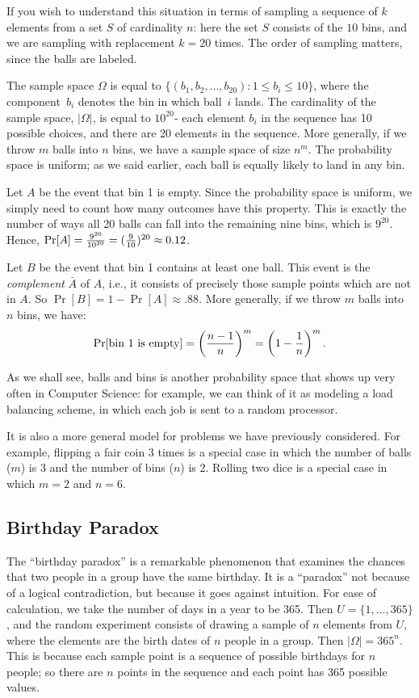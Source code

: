 \documentclass[11pt,fleqn]{article}
\begin{document}
If you wish to understand this situation in terms of sampling a sequence of $k$ elements 
from a set $S$ of cardinality $n$: here the set $S$ consists of the $10$ bins, and we are 
sampling with replacement $k= 20$ times. The order of sampling matters, since the balls 
are labeled. 

The sample space $\Omega$ is equal to 
$\{(b_1,b_2,\ldots,b_{20}):1\le b_i\le 10\}$, where the
component~$b_i$ denotes the bin in which ball~$i$ lands. The cardinality of
the sample space, $|\Omega|$, is equal to $10^{20}$- each element $b_i$ in the sequence
has 10 possible choices, and there are 20 elements in the sequence. More generally,
if we throw $m$ balls into $n$ bins, we have a sample space of size $n^m$. 
The probability space is uniform; as we said earlier, each ball is equally likely
to land in any bin. 

Let $A$ be the event that bin 1 is empty. Since the probability space is uniform, we simply
need to count how many outcomes have this property. This is 
exactly the number of ways all 20 balls can fall into the remaining nine bins, which is $9^{20}$. 
Hence, $\Pr[A]={{9^{20}}\over{{10}^{20}}}=({{9\over{10}}})^{20}\approx 0.12$.

Let $B$ be the event that bin 1 contains at least one ball. This event is the {\it complement\/} $\bar{A}$ of $A$, i.e., 
it consists of precisely those sample points which are not in $A$. So $\Pr[B] = 1 - \Pr[A] \approx .88$. 
More generally, if we throw $m$ balls into $n$ bins, we have: $$
               \Pr[\hbox{\rm bin 1 is empty}]=\left({{n-1}\over n}\right)^m=
                            \left({1-{1\over n}}\right)^m.  $$

As we shall see, balls and bins is another
probability space that shows up very often in Computer Science:
for example, we can think of it as modeling a load balancing
scheme, in which each job is sent to a random processor.

It is also a more general model for problems we have previously considered.
For example, flipping a fair coin 3 times is a special case in which the number of balls 
($m$) is 3 and the number of bins ($n$) is 2. Rolling two dice is a special case in which 
$m = 2$ and $n = 6$. 


\subsection*{Birthday Paradox}

The ``birthday paradox'' is a remarkable phenomenon that examines the chances that two people in a group
have the same birthday.  It is a ``paradox'' not because of a logical contradiction, but because it goes
against intuition. For ease of calculation, we take the number of days in a year to be 365. Then $U = \{1,\dots,365\}$,
and the random experiment consists of drawing a sample of $n$ elements from $U$, where the
elements are the birth dates of $n$ people in a group. Then $|\Omega| = 365^n$.
This is because each sample point is a sequence of possible birthdays for $n$ people; so there are $n$ points
in the sequence and each point has 365 possible values. 
\end{document}
